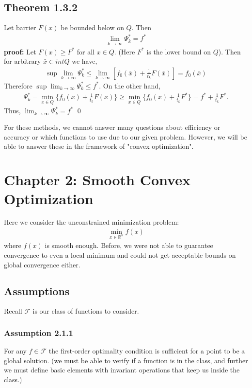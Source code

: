 \documentclass[12pt,a4paper]{article}
\begin{document}
	\subsection*{Theorem 1.3.2}\label{thm132}
	Let barrier $F(x)$ be bounded below on $Q$. Then
	\begin{align*}
		\lim_{k \rightarrow \infty}\Psi_k^* = f^*
	\end{align*}
	\textbf{proof:} Let $F(x) \geq F^*$ for all $x \in Q$. (Here $F^*$ is the lower bound on $Q$). Then for arbitrary $\bar{x} \in int Q$ we have,
	\begin{align*}
		\sup \lim_{k \rightarrow \infty} \Psi_k^* \leq \lim_{k \rightarrow \infty} [f_0(\bar{x}) + \frac{1}{t_k}F(\bar{x})] = f_0(\bar{x})
	\end{align*}
	Therefore $\sup \lim_{k \rightarrow \infty}\Psi_k^* \leq f^*$. On the other hand,
	\begin{align*}
		\Psi_k^* = \min_{x \in Q}\{f_0(x) + \frac{1}{t_k}F(x)\} \geq \min_{x \in Q}\{f_0(x) + \frac{1}{t_k}F^*\} = f^* + \frac{1}{t_k}F^*.
	\end{align*}
	Thus, $\lim_{k \rightarrow \infty}\Psi_k^* = f^*$ \qed
	
	For these methods, we cannot answer many questions about efficiency or accuracy or which functions to use due to our given problem. However, we will be able to answer these in the framework of "convex optimization". 
	
	\section*{Chapter 2: Smooth Convex Optimization}\label{sec:Ch2}
	Here we consider the unconstrained minimization problem:
	\begin{align*}
		\min_{x \in \mathbb{R}^n}f(x)
	\end{align*}
	where $f(x)$ is smooth enough. Before, we were not able to guarantee convergence to even a local minimum and could not get acceptable bounds on global convergence either.
	\subsection*{Assumptions}\label{ch2assumptions}
	Recall $\mathcal{F}$ is our class of functions to consider.
	\subsubsection*{Assumption 2.1.1}
	For any $f \in \mathcal{F}$ the first-order optimality condition is sufficient for a point to be a global solution.
	(we must be able to verify if a function is in the class, and further we must define basic elements with invariant operations that keep us inside the class.)
\end{document}
